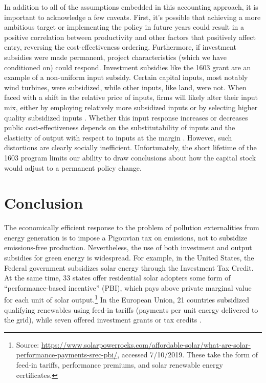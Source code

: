 \documentclass[12pt]{article}
\begin{document}
In addition to all of the assumptions embedded in this accounting approach, it is important to acknowledge a few caveats. First, it's possible that achieving a more ambitious target or implementing the policy in future years could result in a positive correlation between productivity and other factors that positively affect entry, reversing the cost-effectiveness ordering. Furthermore, if investment subsidies were made permanent, project characteristics (which we have conditioned on) could respond. Investment subsidies like the 1603 grant are an example of a non-uniform input subsidy. Certain capital inputs, most notably wind turbines, were subsidized, while other inputs, like land, were not. When faced with a shift in the relative price of inputs, firms will likely alter their input mix, either by employing relatively more subsidized inputs or by selecting higher quality subsidized inputs \citep[as found for other industries in][]{goolsbee_taxes_2004}. Whether this input response increases or decreases public cost-effectiveness depends on the substitutability of inputs and the elasticity of output with respect to inputs at the margin \citep{parish_relative_1982}. However, such distortions are clearly socially inefficient. Unfortunately, the short lifetime of the 1603 program limits our ability to draw conclusions about how the capital stock would adjust to a permanent policy change.

\section{Conclusion \label{sec:Conclusion}}

The economically efficient response to the problem of pollution externalities from energy generation is to impose a Pigouvian tax on emissions, not to subsidize emissions-free production. Nevertheless, the use of both investment and output subsidies for green energy is widespread. For example, in the United States, the Federal government subsidizes solar energy through the Investment Tax Credit. At the same time, 33 states offer residential solar adopters some form of ``performance-based incentive'' (PBI), which pays above private marginal value for each unit of solar output.\footnote{Source: \href{https://www.solarpowerrocks.com/affordable-solar/what-are-solar-performance-payments-srec-pbi/}{https://www.solarpowerrocks.com/affordable-solar/what-are-solar-performance-payments-srec-pbi/}, accessed 7/10/2019. These take the form of feed-in tariffs, performance premiums, and solar renewable energy certificates.} In the European Union, 21 countries subsidized qualifying renewables using feed-in tariffs (payments per unit energy delivered to the grid), while seven offered investment grants or tax credits \citep{JENNER2013385}. 
\end{document}
